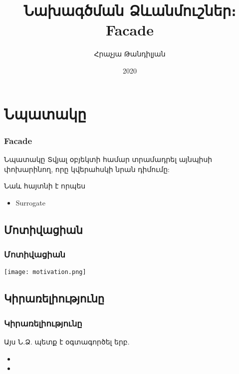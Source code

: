 \documentclass{beamer}
\begin{document}
\title[Facade]{Նախագծման Ձևանմուշներ։ Facade}
\author[Հրաչյա Թանդիլյան\copyright]{Հրաչյա Թանդիլյան}
\date{2020}

\begin{frame}
\titlepage
\end{frame}

\section{Նպատակը}
\begin{frame}\frametitle{Facade}
\begin{block}{Նպատակը}
    Տվյալ օբյեկտի համար տրամադրել այնպիսի փոխարինող, որը կվերահսկի նրան դիմումը:
\end{block}
\vfill
Նաև հայտնի է որպես
\begin{itemize}
    \item Surrogate
\end{itemize}
\end{frame}

\subsection{Մոտիվացիան}
\begin{frame}\frametitle{Մոտիվացիան}
\begin{center}
    \texttt{[image: motivation.png]}
\end{center}
\end{frame}

\subsection{Կիրառելիությունը}
\begin{frame}\frametitle{Կիրառելիությունը}
Այս Ն.Ձ. պետք է օգտագործել երբ.
\vspace{0.5cm}
\begin{itemize}
    \item
    \item
\end{itemize}
\end{frame}
\end{document}
